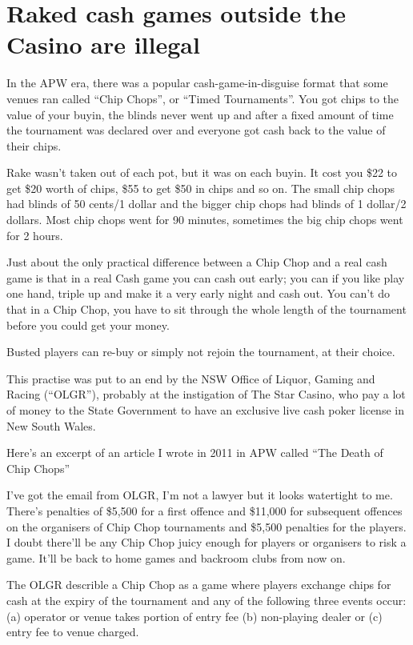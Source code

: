 \section{Raked cash games outside the Casino are illegal}

In the APW era, there was a popular
cash-game-in-disguise format that some venues ran
called ``Chip Chops'', or ``Timed Tournaments''.
You got chips to the value of
your buyin, the blinds never went up and after a fixed
amount of time the tournament was declared over and
everyone got cash back to the value of their chips.

Rake wasn't taken out of each pot, but it was on each buyin.
It cost you \$22 to get \$20 worth of chips, \$55 to get
\$50 in chips and so on. The small chip chops had blinds of
50 cents/1 dollar and the bigger chip chops had blinds of
1 dollar/2 dollars. Most chip chops went for 90 minutes,
sometimes the big chip chops went for 2 hours.

Just about the only practical difference between a
Chip Chop and a real cash game is that in a real Cash game
you can cash out early; you can if you like play one hand,
triple up and make it a very early night and cash out.
You can't do that in a Chip Chop, you have to sit through
the whole length of the tournament before you could get your money.

Busted players can re-buy or simply not rejoin the tournament,
at their choice.

This practise was put to an end by the NSW Office of Liquor,
Gaming and Racing (``OLGR''), probably at the instigation of The Star Casino,
who pay a lot of money to the State Government to
have an exclusive live cash poker license in New South Wales.

Here's an excerpt of an article I wrote in 2011 in APW called
``The Death of Chip Chops''


I've got the email from OLGR, I'm not a lawyer but it looks watertight
to me. There's penalties of \$5,500 for a first offence and \$11,000 for
subsequent offences on the organisers of Chip Chop tournaments and
\$5,500 penalties for the players. I doubt there'll be any Chip Chop
juicy enough for players or organisers to risk a game. It'll be back
to home games and backroom clubs from now on.

The OLGR describle a Chip Chop as a game where players exchange chips for
cash at the expiry of the tournament and any of the following three
events occur: (a) operator or venue takes portion of entry fee
(b) non-playing dealer or (c) entry fee to venue charged.


